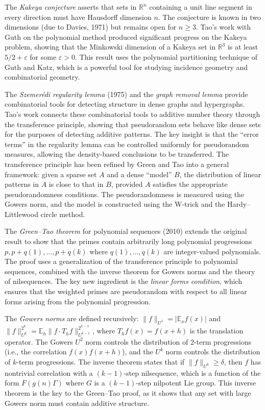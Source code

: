 The \emph{Kakeya conjecture} asserts that sets in $\mathbb{R}^n$ containing a unit line segment in every direction must have Hausdorff dimension $n$. The conjecture is known in two dimensions (due to Davies, 1971) but remains open for $n \ge 3$. Tao's work with Guth on the polynomial method produced significant progress on the Kakeya problem, showing that the Minkowski dimension of a Kakeya set in $\mathbb{R}^3$ is at least $5/2 + \varepsilon$ for some $\varepsilon > 0$. This result uses the polynomial partitioning technique of Guth and Katz, which is a powerful tool for studying incidence geometry and combinatorial geometry.

The \emph{Szemer\'edi regularity lemma} (1975) and the \emph{graph removal lemma} provide combinatorial tools for detecting structure in dense graphs and hypergraphs. Tao's work connects these combinatorial tools to additive number theory through the transference principle, showing that pseudorandom sets behave like dense sets for the purposes of detecting additive patterns. The key insight is that the ``error terms'' in the regularity lemma can be controlled uniformly for pseudorandom measures, allowing the density-based conclusions to be transferred. The transference principle has been refined by Green and Tao into a general framework: given a sparse set $A$ and a dense ``model'' $B$, the distribution of linear patterns in $A$ is close to that in $B$, provided $A$ satisfies the appropriate pseudorandomness conditions. The pseudorandomness is measured using the Gowers norm, and the model is constructed using the W-trick and the Hardy--Littlewood circle method.

The \emph{Green--Tao theorem} for polynomial sequences (2010) extends the original result to show that the primes contain arbitrarily long polynomial progressions $p, p+q(1), \ldots, p+q(k)$ where $q(1), \ldots, q(k)$ are integer-valued polynomials. The proof uses a generalization of the transference principle to polynomial sequences, combined with the inverse theorem for Gowers norms and the theory of nilsequences. The key new ingredient is the \emph{linear forms condition}, which ensures that the weighted primes are pseudorandom with respect to all linear forms arising from the polynomial progression.

The \emph{Gowers norms} are defined recursively: $\|f\|_{U^1} = |\mathbb{E}_x f(x)|$ and $\|f\|_{U^k}^{2^k} = \mathbb{E}_h \|f \cdot T_h f\|_{U^{k-1}}^{2^{k-1}}$, where $T_h f(x) = f(x+h)$ is the translation operator. The Gowers $U^2$ norm controls the distribution of 2-term progressions (i.e., the correlation $f(x) f(x+h)$), and the $U^k$ norm controls the distribution of $k$-term progressions. The inverse theorem states that if $\|f\|_{U^k} \ge \delta$, then $f$ has nontrivial correlation with a $(k-1)$-step nilsequence, which is a function of the form $F(g(n)\Gamma)$ where $G$ is a $(k-1)$-step nilpotent Lie group. This inverse theorem is the key to the Green--Tao proof, as it shows that any set with large Gowers norm must contain additive structure.

